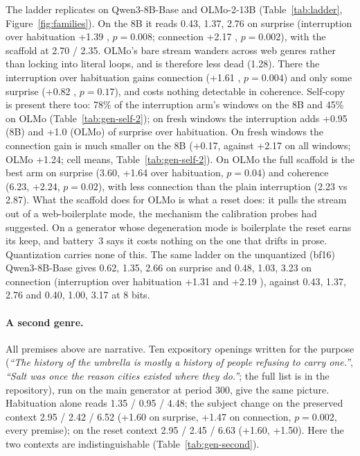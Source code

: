 The ladder replicates on Qwen3-8B-Base and OLMo-2-13B (Table~\ref{tab:ladder},
Figure~\ref{fig:families}). On the 8B it reads 0.43, 1.37, 2.76 on surprise
(interruption over habituation +1.39 , $p=0.008$;
connection +2.17 , $p=0.002$), with the scaffold at 2.70 /
2.35. OLMo's bare stream wanders across web genres rather than locking into
literal loops, and is therefore less dead (1.28). There the interruption over
habituation gains connection (+1.61 , $p=0.004$) and only
some surprise (+0.82 , $p=0.17$), and costs nothing
detectable in coherence. Self-copy is present there too: 78\% of the
interruption arm's windows on the 8B and 45\% on OLMo
(Table~\ref{tab:gen-self-2}); on fresh windows the interruption adds +0.95
(8B) and +1.0 (OLMo) of surprise over habituation. On fresh windows the
connection gain is much smaller on the 8B (+0.17, against +2.17 on all
windows; OLMo +1.24; cell means, Table~\ref{tab:gen-self-2}). On OLMo the
full scaffold is the best arm on surprise (3.60, +1.64 over habituation, $p=0.04$) and
coherence (6.23, +2.24, $p=0.02$), with less connection than the plain
interruption (2.23 vs 2.87). What the scaffold does for OLMo is what a reset
does: it pulls the stream out of a web-boilerplate mode, the mechanism the
calibration probes had suggested. On a generator whose degeneration mode is
boilerplate the reset earns its keep, and battery~3 says it costs nothing on
the one that drifts in prose. Quantization carries none of this. The same
ladder on the unquantized (bf16) Qwen3-8B-Base gives 0.62, 1.35, 2.66 on
surprise and 0.48, 1.03, 3.23 on connection (interruption over habituation
+1.31  and +2.19 ), against 0.43, 1.37,
2.76 and 0.40, 1.00, 3.17 at 8 bits.

\paragraph{A second genre.} All premises above are narrative. Ten expository
openings written for the purpose (\emph{``The history of the umbrella is
mostly a history of people refusing to carry one.''}, \emph{``Salt was once
the reason cities existed where they do.''}; the full list is in the
repository), run on the main generator at period 300, give the same
picture. Habituation alone reads 1.35 / 0.95 / 4.48; the subject change on
the preserved context 2.95 / 2.42 / 6.52 (+1.60  on
surprise, +1.47 on connection, $p=0.002$, every premise); on the reset
context 2.95 / 2.45 / 6.63 (+1.60, +1.50). Here the two contexts are
indistinguishable (Table~\ref{tab:gen-second}).

